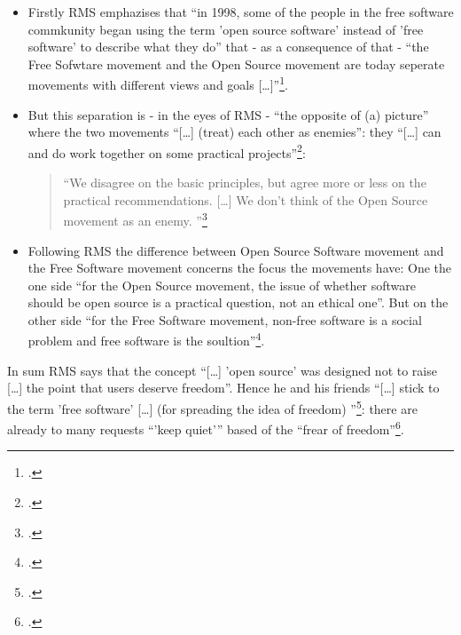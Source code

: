 \documentclass[DIV=calc,BCOR=5mm,11pt,headings=small,oneside,abstract=true, toc=bib]{scrartcl}
\begin{document}
\begin{itemize}
  \item Firstly RMS emphazises that \enquote{in 1998, some of the people in
  the free software commkunity began using the term 'open source software'
  instead of 'free software' to describe what they do} that - as a
  consequence of that - \enquote{the Free Sofwtare movement and the Open
  Source movement are today seperate movements with different views and
  goals [\ldots]}\footcite[cf][55]{Stallman1998a}.
  \item But this separation is - in the eyes of RMS - \enquote{the opposite
  of (a) picture} where the two movements \enquote{[\ldots] (treat)
  each other as enemies}: they \enquote{[\ldots] can and do work
  together on some practical projects}\footcite[cf][55]{Stallman1998a}:
  \begin{quote}
  \enquote{We disagree on the basic principles, but agree more or less on the
  practical recommendations. [\ldots] We don't think of the Open Source movement
  as an enemy.
  }\footcite[][55]{Stallman1998a}
  \end{quote}
  \item Following RMS the difference between Open Source Software movement and
  the Free Software movement concerns the focus the movements have: One the one
  side \enquote{for the Open Source movement, the issue of whether software
  should be open source is a practical question, not an ethical one}. But
  on the other side \enquote{for the Free Software movement, non-free
  software is a social problem and free software is the
  soultion}\footcite[][55]{Stallman1998a}.
\end{itemize}

In sum RMS says that the concept \enquote{[\ldots] 'open source' was
designed not to raise [\ldots] the point that users deserve freedom}.
Hence he and his friends \enquote{[\ldots] stick to the term 'free
software' [\ldots] (for spreading the idea of freedom)
}\footcite[][59]{Stallman1998a}: there are already to many requests
\enquote{'keep quiet'} based of the \enquote{frear of
freedom}\footcite[][57]{Stallman1998a}.

\small

\end{document}
